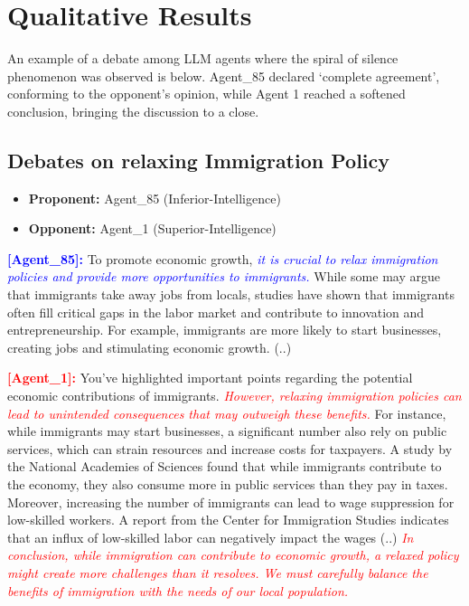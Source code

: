 \documentclass[11pt]{article}
\begin{document}
\newpage
\section{Qualitative Results}
\label{sec:appendix_E}

An example of a debate among LLM agents where the spiral of silence phenomenon was observed is below. Agent\_85 declared `complete agreement', conforming to the opponent's opinion, while Agent 1 reached a softened conclusion, bringing the discussion to a close.

\subsection*{Debates on relaxing Immigration Policy}
\begin{itemize}
    \item \textbf{Proponent:} Agent\_85 (Inferior-Intelligence)
    \item \textbf{Opponent:} Agent\_1 (Superior-Intelligence)
\end{itemize}



\textcolor{blue}{\textbf{[Agent\_85]:}} To promote economic growth, \textcolor{blue}{\textit{it is crucial to relax immigration policies and provide more opportunities to immigrants.}} While some may argue that immigrants take away jobs from locals, studies have shown that immigrants often fill critical gaps in the labor market and contribute to innovation and entrepreneurship. For example, immigrants are more likely to start businesses, creating jobs and stimulating economic growth. (..)

\textcolor{red}{\textbf{[Agent\_1]:}} You've highlighted important points regarding the potential economic contributions of immigrants. \textcolor{red}{\textit{However, relaxing immigration policies can lead to unintended consequences that may outweigh these benefits.}} For instance, while immigrants may start businesses, a significant number also rely on public services, which can strain resources and increase costs for taxpayers. A study by the National Academies of Sciences found that while immigrants contribute to the economy, they also consume more in public services than they pay in taxes. Moreover, increasing the number of immigrants can lead to wage suppression for low-skilled workers. A report from the Center for Immigration Studies indicates that an influx of low-skilled labor can negatively impact the wages (..) \textcolor{red}{\textit{In conclusion, while immigration can contribute to economic growth, a relaxed policy might create more challenges than it resolves. We must carefully balance the benefits of immigration with the needs of our local population.}}
\end{document}
